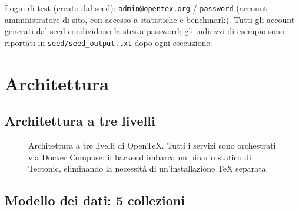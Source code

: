 \documentclass[11pt,a4paper]{article}
\begin{document}
Login di test (creato dal seed): \texttt{admin@opentex.org} / \texttt{password} (account amministratore di sito, con accesso a statistiche e benchmark). Tutti gli account generati dal seed condividono la stessa password; gli indirizzi di esempio sono riportati in \texttt{seed/seed\_output.txt} dopo ogni esecuzione.

\section{Architettura}

\subsection{Architettura a tre livelli}

\begin{figure}[h!]
\centering
{}
\caption{Architettura a tre livelli di OpenTeX. Tutti i servizi sono orchestrati via Docker Compose; il backend imbarca un binario statico di Tectonic, eliminando la necessità di un'installazione TeX separata.}
\end{figure}

\subsection{Modello dei dati: 5 collezioni}
\end{document}
